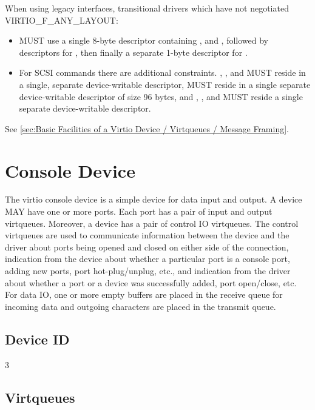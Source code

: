 When using legacy interfaces, transitional drivers which have not
negotiated VIRTIO_F_ANY_LAYOUT:

\begin{itemize}
\item MUST use a single 8-byte descriptor containing ,
   and , followed by descriptors
  for , then finally a separate 1-byte descriptor
  for .

\item For SCSI commands there are additional constraints.
  , ,  and
   MUST reside in a single, separate
  device-writable descriptor,  MUST reside in a
  single separate device-writable descriptor of size 96 bytes,
  and , ,  and
   MUST reside a single separate
  device-writable descriptor.
\end{itemize}

See \ref{sec:Basic Facilities of a Virtio Device / Virtqueues / Message Framing}.

\section{Console Device}\label{sec:Device Types / Console Device}

The virtio console device is a simple device for data input and
output. A device MAY have one or more ports. Each port has a pair
of input and output virtqueues. Moreover, a device has a pair of
control IO virtqueues. The control virtqueues are used to
communicate information between the device and the driver about
ports being opened and closed on either side of the connection,
indication from the device about whether a particular port is a
console port, adding new ports, port hot-plug/unplug, etc., and
indication from the driver about whether a port or a device was
successfully added, port open/close, etc. For data IO, one or
more empty buffers are placed in the receive queue for incoming
data and outgoing characters are placed in the transmit queue.

\subsection{Device ID}\label{sec:Device Types / Console Device / Device ID}

  3

\subsection{Virtqueues}\label{sec:Device Types / Console Device / Virtqueues}


